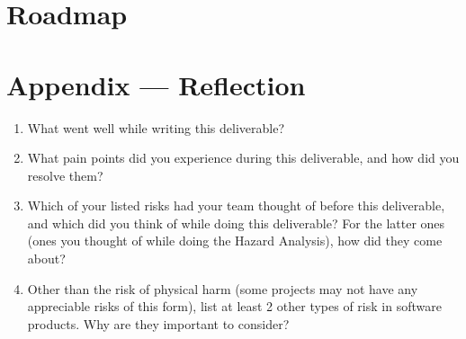 \documentclass{article}
\begin{document}

\section{Roadmap}


\newpage{}

\section*{Appendix --- Reflection}




\begin{enumerate}
    \item What went well while writing this deliverable? 
    \item What pain points did you experience during this deliverable, and how
    did you resolve them?
    \item Which of your listed risks had your team thought of before this
    deliverable, and which did you think of while doing this deliverable? For
    the latter ones (ones you thought of while doing the Hazard Analysis), how
    did they come about?
    \item Other than the risk of physical harm (some projects may not have any
    appreciable risks of this form), list at least 2 other types of risk in
    software products. Why are they important to consider?
\end{enumerate}
\end{document}
